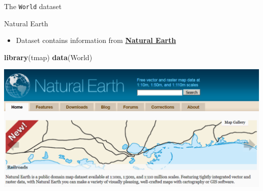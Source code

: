 \documentclass[
  ignorenonframetext,
]{beamer}
\newenvironment{Shaded}{\begin{snugshade}}{\end{snugshade}}
\newcommand{\KeywordTok}[1]{\textcolor[rgb]{0.13,0.29,0.53}{\textbf{#1}}}
\newcommand{\NormalTok}[1]{#1}
\providecommand{\tightlist}{%
  \setlength{\itemsep}{0pt}\setlength{\parskip}{0pt}}
\begin{document}
\begin{frame}[fragile]{The \texttt{World} dataset}
\protect\hypertarget{the-world-dataset}{}
\begin{block}{Natural Earth}
\protect\hypertarget{natural-earth}{}
\begin{itemize}
\tightlist
\item
  Dataset contains information from
  \href{http://www.naturalearthdata.com/}{\textbf{Natural Earth}}
\end{itemize}

\begin{Shaded}
\begin{Highlighting}[]
\KeywordTok{library}\NormalTok{(tmap)}
\KeywordTok{data}\NormalTok{(World)}
\end{Highlighting}
\end{Shaded}

\includegraphics{pics/NaturalEarthData.PNG}
\end{block}
\end{frame}
\end{document}
